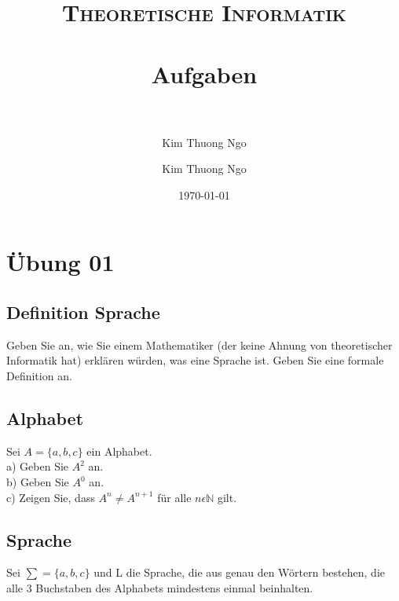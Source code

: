 \documentclass[paper=a4, fontsize=11pt]{scrartcl}
\author{Kim Thuong Ngo}
\title{	
\normalfont \normalsize 
\textsc{Theoretische Informatik} \\ [25pt] 
\horrule{0.5pt} \\[0.4cm] 
\huge Aufgaben \\ 
\horrule{2pt} \\[0.5cm] 
}
\author{Kim Thuong Ngo}
\date{\normalsize\today}
\numberwithin{equation}{section}
\numberwithin{figure}{section}
\numberwithin{table}{section}
\begin{document}
\maketitle 

\newpage

\tableofcontents


\newpage

\section{Übung 01}


\subsection{Definition Sprache}

Geben Sie an, wie Sie einem Mathematiker (der keine Ahnung von theoretischer Informatik hat) erklären würden, was eine Sprache ist. Geben Sie eine formale Definition an. \\


\subsection{Alphabet}

Sei $A= \{ a,b,c \}$ ein Alphabet.\\

a) Geben Sie $A^{2}$ an. \\

b) Geben Sie $A^{0}$ an. \\

c) Zeigen Sie, dass $A^{n} \neq A^{n+1}$ für alle $n \epsilon \mathbb{N}$ gilt. \\


\subsection{Sprache}

Sei $\sum = \{ a,b,c \}$  und L die Sprache, die aus genau den Wörtern bestehen, die alle 3 Buchstaben des Alphabets mindestens einmal beinhalten. \\
\end{document}
